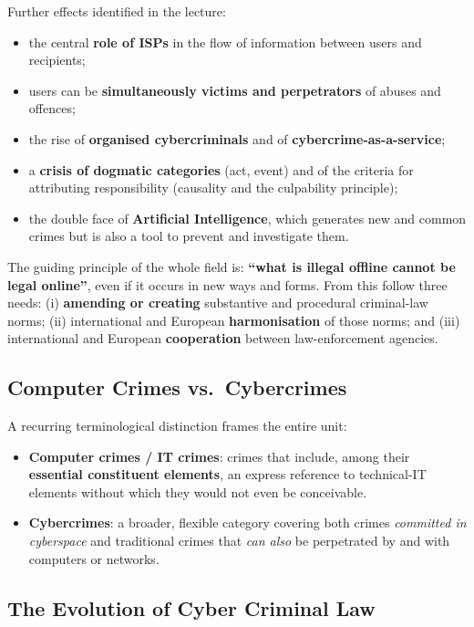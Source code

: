 \documentclass[11pt,a4paper,openany]{report}
\theoremstyle{definition}
\theoremstyle{plain}
\theoremstyle{remark}
\begin{document}
Further effects identified in the lecture:
\begin{itemize}
    \item the central \textbf{role of ISPs} in the flow of information between users and recipients;
    \item users can be \textbf{simultaneously victims and perpetrators} of abuses and offences;
    \item the rise of \textbf{organised cybercriminals} and of \textbf{cybercrime-as-a-service};
    \item a \textbf{crisis of dogmatic categories} (act, event) and of the criteria for attributing responsibility (causality and the culpability principle);
    \item the double face of \textbf{Artificial Intelligence}, which generates new and common crimes but is also a tool to prevent and investigate them.
\end{itemize}

\begin{keypoint}
The guiding principle of the whole field is: \textbf{``what is illegal offline cannot be legal online''}, even if it occurs in new ways and forms. From this follow three needs: (i) \textbf{amending or creating} substantive and procedural criminal-law norms; (ii) international and European \textbf{harmonisation} of those norms; and (iii) international and European \textbf{cooperation} between law-enforcement agencies.
\end{keypoint}

\subsection{Computer Crimes vs.\ Cybercrimes}

A recurring terminological distinction frames the entire unit:
\begin{itemize}
    \item \textbf{Computer crimes / IT crimes}: crimes that include, among their \textbf{essential constituent elements}, an express reference to technical-IT elements without which they would not even be conceivable.
    \item \textbf{Cybercrimes}: a broader, flexible category covering both crimes \emph{committed in cyberspace} and traditional crimes that \emph{can also} be perpetrated by and with computers or networks.
\end{itemize}

\subsection{The Evolution of Cyber Criminal Law}
\end{document}
